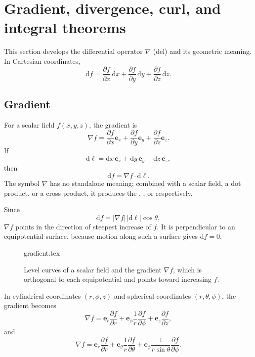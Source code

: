 \section{Gradient, divergence, curl, and integral theorems}

This section develops the differential operator $\nabla$ (del) and its geometric meaning. In Cartesian coordinates,
\begin{equation}
\mathrm{d}f=\frac{\partial f}{\partial x}\,\mathrm{d}x
+\frac{\partial f}{\partial y}\,\mathrm{d}y
+\frac{\partial f}{\partial z}\,\mathrm{d}z.
\end{equation}

\subsection{Gradient}
For a scalar field $f(x,y,z)$, the gradient is
\begin{equation}
\nabla f=\frac{\partial f}{\partial x}\mathbf{e}_x
+\frac{\partial f}{\partial y}\mathbf{e}_y
+\frac{\partial f}{\partial z}\mathbf{e}_z.
\end{equation}
If
\begin{equation}
\mathrm{d}\boldsymbol{\ell}=\mathrm{d}x\,\mathbf{e}_x
+\mathrm{d}y\,\mathbf{e}_y
+\mathrm{d}z\,\mathbf{e}_z,
\end{equation}
then
\begin{equation}
\mathrm{d}f=\nabla f\cdot\mathrm{d}\boldsymbol{\ell}.
\end{equation}
The symbol $\nabla$ has no standalone meaning; combined with a scalar field, a dot product, or a cross product, it produces the , , or  respectively.

Since
\begin{equation}
\mathrm{d}f=|\nabla f|\,|\mathrm{d}\boldsymbol{\ell}|\cos\theta,
\end{equation}
$\nabla f$ points in the direction of steepest increase of $f$. It is perpendicular to an equipotential surface, because motion along such a surface gives $\mathrm{d}f=0$.

\begin{figure}[htb]
    \centering
    {gradient.tex}
    \caption{Level curves of a scalar field and the gradient $\nabla f$, which is orthogonal to each equipotential and points toward increasing $f$.}
    \label{fig:vec-gradient}
\end{figure}

In cylindrical coordinates $(r,\phi,z)$ and spherical coordinates $(r,\theta,\phi)$, the gradient becomes
\begin{equation}
\nabla f=\mathbf{e}_r\frac{\partial f}{\partial r}
+\mathbf{e}_\phi\frac{1}{r}\frac{\partial f}{\partial\phi}
+\mathbf{e}_z\frac{\partial f}{\partial z},
\end{equation}
and
\begin{equation}
\nabla f=\mathbf{e}_r\frac{\partial f}{\partial r}
+\mathbf{e}_\theta\frac{1}{r}\frac{\partial f}{\partial\theta}
+\mathbf{e}_\phi\frac{1}{r\sin\theta}\frac{\partial f}{\partial\phi}.
\end{equation}

